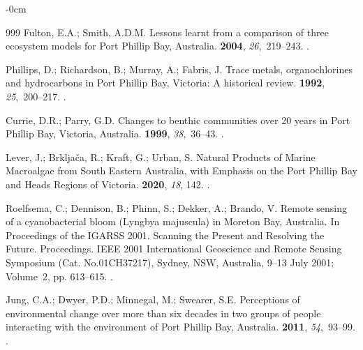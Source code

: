 \documentclass[jmse,article,accept,pdftex,oneauthor]{Definitions/mdpi}
\begin{document}
\begin{adjustwidth}{-\extralength}{0cm}
\begin{thebibliography}{999}
Fulton, E.A.; Smith, A.D.M.
\newblock Lessons learnt from a comparison of three ecosystem models for Port
  Phillip Bay, Australia.
 {\bf 2004}, {\em
  26},~219--243.
.

Phillips, D.; Richardson, B.; Murray, A.; Fabris, J.
\newblock Trace metals, organochlorines and hydrocarbons in Port Phillip Bay,
  Victoria: A historical review.
 {\bf 1992}, {\em 25},~200--217.
.

Currie, D.R.; Parry, G.D.
\newblock Changes to benthic communities over 20 years in Port Phillip Bay,
  Victoria, Australia.
 {\bf 1999}, {\em 38},~36--43.
.

Lever, J.; Brkljača, R.; Kraft, G.; Urban, S.
\newblock Natural Products of Marine Macroalgae from South Eastern Australia,
  with Emphasis on the Port Phillip Bay and Heads Regions of Victoria.
 {\bf 2020}, {\em 18}, 142.
.

Roelfsema, C.; Dennison, B.; Phinn, S.; Dekker, A.; Brando, V.
\newblock Remote sensing of a cyanobacterial bloom (Lyngbya majuscula) in
  Moreton Bay, Australia.
\newblock In Proceedings of the IGARSS 2001. Scanning the Present and Resolving
  the Future. Proceedings. IEEE 2001 International Geoscience and Remote
  Sensing Symposium (Cat. No.01CH37217), Sydney, NSW, Australia, 9--13 July 2001; Volume~2, pp. 613--615.
.

Jung, C.A.; Dwyer, P.D.; Minnegal, M.; Swearer, S.E.
\newblock Perceptions of environmental change over more than six decades in two
  groups of people interacting with the environment of Port Phillip Bay,
  Australia.
 {\bf 2011}, {\em 54},~93--99.
.


\end{thebibliography}
\end{adjustwidth}
\end{document}
